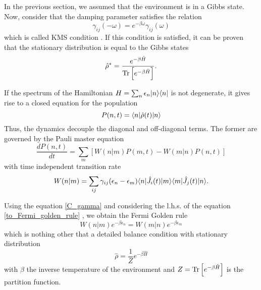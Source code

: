 In the previous section, we assumed that the environment is in a Gibbs state. Now, consider that the damping parameter satisfies the relation
\begin{equation}\label{C_gamma}
    \gamma_{ij}(-\omega) = e^{-\beta \omega}\gamma_{ij}(\omega)
\end{equation}
which is called KMS condition \cite{Breuer-Petruccione}.
If this condition is satisfied, it can be proven that the stationary distribution is equal to the Gibbs states \cite{Breuer-Petruccione}
\begin{equation}
    \hat\rho^* = \frac{e^{-\beta \hat H}}{\operatorname{Tr}\left[e^{-\beta \hat H}\right]}.
\end{equation}

If the spectrum of the Hamiltonian $H = \sum_n \epsilon_n\lvert n\rangle\langle n\rvert$ is not degenerate, it gives rise to a closed equation for the population 
\begin{equation}
    P(n,t) = \langle n\rvert\hat\rho(t)\lvert n\rangle
\end{equation}
Thus, the dynamics decouple the diagonal and off-diagonal terms. The former are governed by the Pauli master equation
\begin{equation}\label{to_Fermi_golden_rule}
    \frac{dP(n,t)}{dt} = \sum_m \left[ W(n|m)P(m,t) - W(m|n)P(n,t)\right]
\end{equation}
with time independent transition rate
\begin{equation}
    W(n|m) = \sum_{ij} \gamma_{ij}(\epsilon_n -\epsilon_m)\langle n\rvert\hat J_i(t)\lvert m\rangle \langle m\rvert\hat J_j(t)\lvert n\rangle. 
\end{equation}

Using the equation \eqref{C_gamma} and considering the l.h.s. of the equation \eqref{to_Fermi_golden_rule} , we obtain the Fermi Golden rule
\begin{equation}
    W(n|m)e^{-\beta \epsilon_n} = W(m|n) e^{-\beta \epsilon_m}
\end{equation}
which is nothing other that a detailed balance condition with stationary distribution
\begin{equation}
    \hat\rho = \frac{1}{Z}e^{-\beta \hat H}
\end{equation}
with $\beta$ the inverse temperature of the environment and $Z = \operatorname{Tr}\left[e^{-\beta \hat H}\right]$ is the partition function.



%